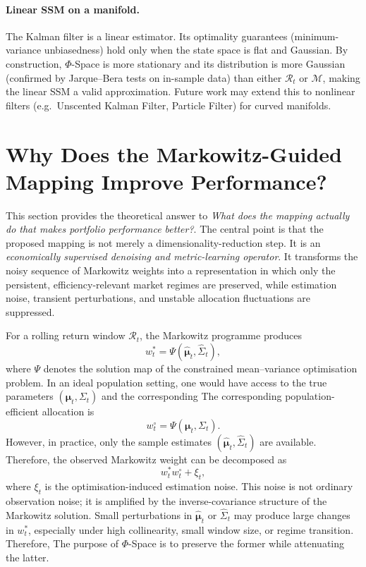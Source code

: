 \documentclass[preprint,12pt]{elsarticle}
\theoremstyle{plain}
\theoremstyle{definition}
\newcommand{\calM}{\mathcal{M}}
\newcommand{\calR}{\mathcal{R}}
\newcommand{\bmu}{\bm{\mu}}
\begin{document}
\paragraph{Linear SSM on a manifold.}
The Kalman filter is a linear estimator.  Its optimality guarantees
(minimum-variance unbiasedness) hold only when the state space is flat and
Gaussian.  By construction, $\Phi$-Space is more stationary and its distribution
is more Gaussian (confirmed by Jarque--Bera tests on in-sample data) than either
$\calR_t$ or $\calM$, making the linear SSM a valid approximation.  Future work
may extend this to nonlinear filters (e.g.\ Unscented Kalman Filter, Particle
Filter) for curved manifolds.

\section{Why Does the Markowitz-Guided Mapping Improve Performance?}
\label{sec:why_phi_improves}

This section provides the theoretical answer to \emph{What does the mapping actually do that makes portfolio performance better?}. The central point is that the proposed mapping is not merely a dimensionality-reduction step. It is an \emph{economically supervised denoising and metric-learning operator}. It transforms the noisy sequence of Markowitz weights into a representation in which only the persistent, efficiency-relevant market regimes are preserved, while estimation noise, transient perturbations, and unstable allocation fluctuations are suppressed.

For a rolling return window $\mathcal{R}_t$, the Markowitz programme produces
\[
w_t^*=\Psi(\hat{\bmu}_t,\hat{\Sigma}_t),
\]
where $\Psi$ denotes the solution map of the constrained mean--variance optimisation problem. In an ideal population setting, one would have access to the true parameters $(\bmu_t,\Sigma_t)$ and the corresponding The corresponding population-efficient allocation is
\[
w_t^\circ
=
\Psi(\bmu_t,\Sigma_t).
\]
However, in practice, only the sample estimates
$\left(\hat{\bmu}_t,\hat{\Sigma}_t\right)$
are available. Therefore, the observed Markowitz weight can be decomposed as
\begin{equation}
	w_t^*
	w_t^\circ
	+
	\xi_t,
	\label{eq:markowitz_noise_decomposition}
\end{equation}
where $\xi_t$ is the optimisation-induced estimation noise. This noise is not ordinary observation noise; it is amplified by the inverse-covariance structure of the Markowitz solution. Small perturbations in $\hat{\bmu}_t$ or $\hat{\Sigma}_t$ may produce large changes in $w_t^*$, especially under high collinearity, small window size, or regime transition. Therefore, The purpose of $\Phi$-Space is to preserve the former while attenuating the latter.
\end{document}

